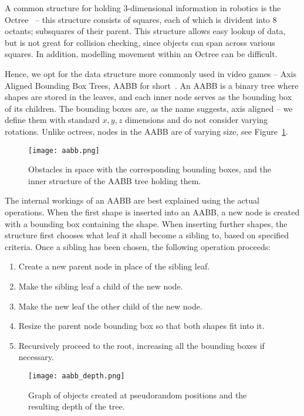 A common structure for holding 3-dimensional information in robotics is the Octree~\cite{octree} -- this structure consists of squares, each of which is divident into 8 octants; subsquares of their parent. This structure allows easy lookup of data, but is not great for collision checking, since objects can span across various squares. In addition, modelling movement within an Octree can be difficult.

Hence, we opt for the data structure more commonly used in video games -- Axis Aligned Bounding Box Trees, AABB for short~\cite{aabb}. An AABB is a binary tree where shapes are stored in the leaves, and each inner node serves as the bounding box of its children. The bounding boxes are, as the name suggests, axis aligned -- we define them with standard $x, y, z$ dimensions and do not consider varying rotations. Unlike octrees, nodes in the AABB are of varying size, see Figure~\ref{fig:aabb}.

\begin{figure}[h]
  \centering
  \texttt{[image: aabb.png]}
  \caption{Obstacles in space with the corresponding bounding boxes, and the inner structure of the AABB tree holding them.}\label{fig:aabb}
\end{figure}

The internal workings of an AABB are best explained using the actual operations. When the first shape is inserted into an AABB, a new node is created with a bounding box containing the shape. When inserting further shapes, the structure first chooses what leaf it shall become a sibling to, based on specified criteria.
Once a sibling has been chosen, the following operation proceeds:

\begin{enumerate}
\item Create a new parent node in place of the sibling leaf.
\item Make the sibling leaf a child of the new node.
\item Make the new leaf the other child of the new node.
\item Resize the parent node bounding box so that both shapes fit into it.
\item Recursively proceed to the root, increasing all the bounding boxes if necessary.
\end{enumerate}

\begin{figure}
  \centering
  \texttt{[image: aabb\_depth.png]}
  \caption{Graph of objects created at pseudorandom positions and the resulting depth of the tree.}\label{fig:aabb_depth}
\end{figure}

